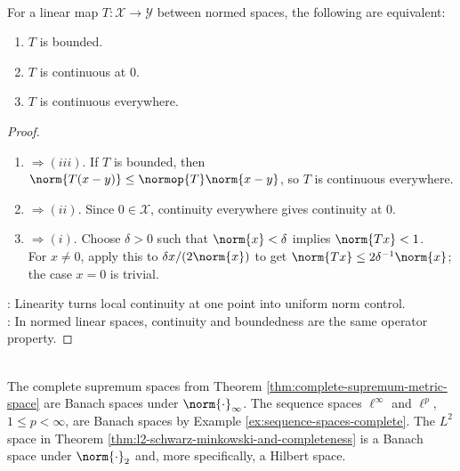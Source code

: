 \begin{theorem} \label{thm:bounded-linear-map-continuity-equivalences} \\
For a linear map $T:\mathcal{X}\to\mathcal{Y}$ between normed spaces, the following are equivalent:
\begin{enumerate}[label=(\roman*)]
\setlength{\itemsep}{0pt}
\item $T$ is bounded.
\item $T$ is continuous at $0$.
\item $T$ is continuous everywhere.
\end{enumerate}
\begin{proof}
\begin{enumerate}[label=(\roman*).]
\setlength{\itemsep}{0pt}
\item[$(i)$] $\Rightarrow (iii)$. If $T$ is bounded, then $\norm{T(x-y)}\leq\normop{T}\norm{x-y}$, so $T$ is continuous everywhere.
\item[$(iii)$] $\Rightarrow (ii)$. Since $0\in\mathcal{X}$, continuity everywhere gives continuity at $0$.
\item[$(ii)$] $\Rightarrow (i)$. Choose $\delta>0$ such that $\norm{x}<\delta$ implies $\norm{Tx}<1$.\\
For $x\neq0$, apply this to $\delta x/(2\norm{x})$ to get $\norm{Tx}\leq2\delta^{-1}\norm{x}$; the case $x=0$ is trivial.
\end{enumerate}
: Linearity turns local continuity at one point into uniform norm control.\\
: In normed linear spaces, continuity and boundedness are the same operator property.
\end{proof}
\end{theorem}

\begin{example} \label{ex:standard-banach-space-examples} \\
The complete supremum spaces from Theorem \ref{thm:complete-supremum-metric-space} are Banach spaces under $\norm{\cdot}_{\infty}$. The sequence spaces $\ell^\infty$ and $\ell^p$, $1\leq p<\infty$, are Banach spaces by Example \ref{ex:sequence-spaces-complete}. The $L^2$ space in Theorem \ref{thm:l2-schwarz-minkowski-and-completeness} is a Banach space under $\norm{\cdot}_2$ and, more specifically, a Hilbert space.
\end{example}
